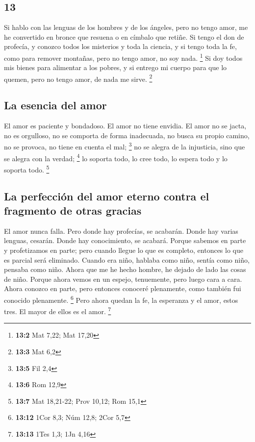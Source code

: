 \begin{paracol}{2}
\hypertarget{section-24}{%
\section{13}\label{section-24}}

 Si hablo con las lenguas de los hombres y de los ángeles,
pero no tengo amor, me he convertido en bronce que resuena o en címbalo
que retiñe.  Si tengo el don de profecía, y conozco todos
los misterios y toda la ciencia, y si tengo toda la fe, como para
remover montañas, pero no tengo amor, no soy nada. \footnote{\textbf{13:2}
  Mat 7,22; Mat 17,20}  Si doy todos mis bienes para
alimentar a los pobres, y si entrego mi cuerpo para que lo quemen, pero
no tengo amor, de nada me sirve. \footnote{\textbf{13:3} Mat 6,2}

\hypertarget{la-esencia-del-amor}{%
\subsection{La esencia del amor}\label{la-esencia-del-amor}}

 El amor es paciente y bondadoso. El amor no tiene
envidia. El amor no se jacta, no es orgulloso,  no se
comporta de forma inadecuada, no busca su propio camino, no se provoca,
no tiene en cuenta el mal; \footnote{\textbf{13:5} Fil 2,4}
 no se alegra de la injusticia, sino que se alegra con la
verdad; \footnote{\textbf{13:6} Rom 12,9}  lo soporta
todo, lo cree todo, lo espera todo y lo soporta todo. \footnote{\textbf{13:7}
  Mat 18,21-22; Prov 10,12; Rom 15,1}

\hypertarget{la-perfecciuxf3n-del-amor-eterno-contra-el-fragmento-de-otras-gracias}{%
\subsection{La perfección del amor eterno contra el fragmento de otras
gracias}\label{la-perfecciuxf3n-del-amor-eterno-contra-el-fragmento-de-otras-gracias}}

 El amor nunca falla. Pero donde hay profecías, se
acabarán. Donde hay varias lenguas, cesarán. Donde hay conocimiento, se
acabará.  Porque sabemos en parte y profetizamos en parte;
 pero cuando llegue lo que es completo, entonces lo que
es parcial será eliminado.  Cuando era niño, hablaba como
niño, sentía como niño, pensaba como niño. Ahora que me he hecho hombre,
he dejado de lado las cosas de niño.  Porque ahora vemos
en un espejo, tenuemente, pero luego cara a cara. Ahora conozco en
parte, pero entonces conoceré plenamente, como también fui conocido
plenamente. \footnote{\textbf{13:12} 1Cor 8,3; Núm 12,8; 2Cor 5,7}
 Pero ahora quedan la fe, la esperanza y el amor, estos
tres. El mayor de ellos es el amor. \footnote{\textbf{13:13} 1Tes 1,3;
  1Jn 4,16}


\end{paracol}

